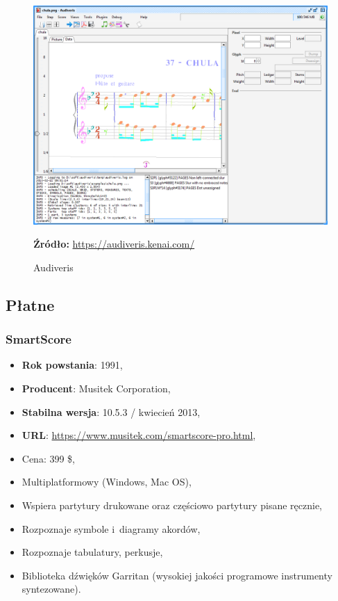 \documentclass[polish,thesis,12pt]{dcsbook}
\newcommand{\source}[2]{
  	\caption*{\textbf{Źródło:} \href{#1}{{#2}}}
}
\begin{document}
\begin{figure}[H]
  \centering
  \includegraphics[scale=0.35,bb=0 0 1045 776]{img/audiveris.png}
  \caption{Audiveris}
  \label{audiveris}
  \source{https://audiveris.kenai.com/docs/manual/handbook.html}{https://audiveris.kenai.com/}
\end{figure}
\subsection{Płatne}
\subsubsection{SmartScore}
\begin{itemize}
  \item \textbf{Rok powstania}: 1991,
  \item \textbf{Producent}: Musitek Corporation,
  \item \textbf{Stabilna wersja}: 10.5.3 / kwiecień 2013,
  \item \textbf{URL}: \url{https://www.musitek.com/smartscore-pro.html},
  \item Cena: 399 \$,
  \item Multiplatformowy (Windows, Mac OS),
  \item Wspiera partytury drukowane oraz częściowo partytury pisane ręcznie,
  \item Rozpoznaje symbole i~diagramy akordów,
  \item Rozpoznaje tabulatury, perkusje,
  \item Biblioteka dźwięków Garritan (wysokiej jakości programowe instrumenty syntezowane).
\end{itemize}
\end{document}
